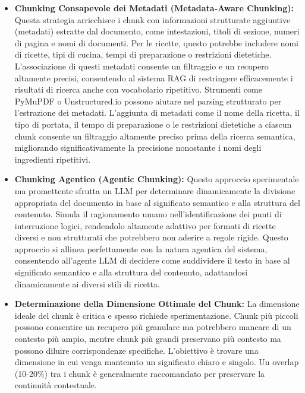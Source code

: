 \documentclass[a4paper, 11pt]{article}
\begin{document}
\begin{itemize}
    \item \textbf{Chunking Consapevole dei Metadati (Metadata-Aware Chunking):} Questa strategia arricchisce i chunk con informazioni strutturate aggiuntive (metadati) estratte dal documento, come intestazioni, titoli di sezione, numeri di pagina e nomi di documenti. \cite{semantic_chunking_multimodal} Per le ricette, questo potrebbe includere nomi di ricette, tipi di cucina, tempi di preparazione o restrizioni dietetiche. L'associazione di questi metadati consente un filtraggio e un recupero altamente precisi, consentendo al sistema RAG di restringere efficacemente i risultati di ricerca anche con vocabolario ripetitivo. \cite{metadata_aware_chunking_asimsultan} Strumenti come PyMuPDF o Unstructured.io possono aiutare nel parsing strutturato per l'estrazione dei metadati. \cite{metadata_aware_chunking_asimsultan} L'aggiunta di metadati come il nome della ricetta, il tipo di portata, il tempo di preparazione o le restrizioni dietetiche \cite{ai_recipe_generator} a ciascun chunk consente un filtraggio altamente preciso prima della ricerca semantica, migliorando significativamente la precisione nonostante i nomi degli ingredienti ripetitivi.
    \item \textbf{Chunking Agentico (Agentic Chunking):} Questo approccio sperimentale ma promettente sfrutta un LLM per determinare dinamicamente la divisione appropriata del documento in base al significato semantico e alla struttura del contenuto. \cite{chunking_strategies_ibm} Simula il ragionamento umano nell'identificazione dei punti di interruzione logici, rendendolo altamente adattivo per formati di ricette diversi e non strutturati che potrebbero non aderire a regole rigide. \cite{chunking_strategies_ibm} Questo approccio si allinea perfettamente con la natura agentica del sistema, consentendo all'agente LLM di decidere come suddividere il testo in base al significato semantico e alla struttura del contenuto, adattandosi dinamicamente ai diversi stili di ricetta.
    \item \textbf{Determinazione della Dimensione Ottimale del Chunk:} La dimensione ideale del chunk è critica e spesso richiede sperimentazione. \cite{chunking_strategies_ibm} Chunk più piccoli possono consentire un recupero più granulare ma potrebbero mancare di un contesto più ampio, mentre chunk più grandi preservano più contesto ma possono diluire corrispondenze specifiche. \cite{enhancing_rag_ibm} L'obiettivo è trovare una dimensione in cui venga mantenuto un significato chiaro e singolo. \cite{semantic_chunking_multimodal} Un overlap (10-20\%) tra i chunk è generalmente raccomandato per preservare la continuità contestuale. \cite{semantic_chunking_multimodal}
\end{itemize}
\end{document}
